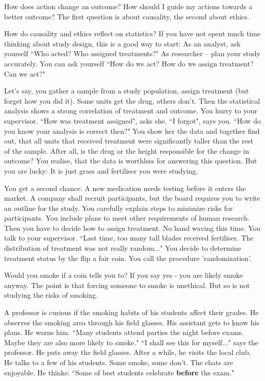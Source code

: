 How does action change an outcome?
How should I guide my actions towards a better outcome?
The first question is about causality, the second about ethics.

How do causality and ethics reflect on statistics?
If you have not spent much time thinking about study design, this is a good way to start: 
As an analyst, ask yourself “Who acted? Who assigned treatments?"
As researcher -- plan your study accurately. You can ask yourself “How do we act? How do we assign treatment? Can we act?"

Let's say, you gather a sample from a study population, assign treatment (but forget how you did it). Some units get the drug, others don't. Then the statistical analysis shows a strong correlation of treatment and outcome. You hurry to your supervisor. “How was treatment assigned", asks she. “I forgot", says you.
“How do you know your analysis is correct then?"
You show her the data and together find out, that all units that received treatment were significantly taller than the rest of the sample.
After all, is the drug or the height responsible for the change  in outcome?
You realise, that the data is worthless for answering this question.
But you are lucky: It is just grass and fertiliser you were studying.

You get a second chance. A new medication needs testing before it enters the market. 
A company shall recruit participants, but the board requires you to write an outline for the study.
You carefully  explain steps to minimize risks for participants. You include plans to meet other requirements of human research.
Then you have to decide how to assign treatment.
No hand waving this time. You talk to your supervisor.
“Last time, too many tall blades received fertiliser. The distribution of treatment was not really random..."
You decide to determine treatment status by the flip a fair coin.
You call the procedure 'randomization'.

Would you smoke if a coin tells you to? If you say yes - you are likely smoke anyway. The point is that forcing someone to smoke is unethical. But so is not studying the risks of smoking.

A professor is curious if the smoking habits of his students affect their grades. 
He observes the smoking area through his field glasses.
His assistant gets to know his plans. He warns him. “Many students attend parties the night before exams. Maybe they are also more likely to smoke." “I shall see this for myself..." says the professor. He puts away the field glasses. After a while, he visits the local club.
He talks to a few of his students. Some smoke, some don't. The chats are enjoyable. He thinks: “Some of best students celebrate \textbf{before} the exam."

